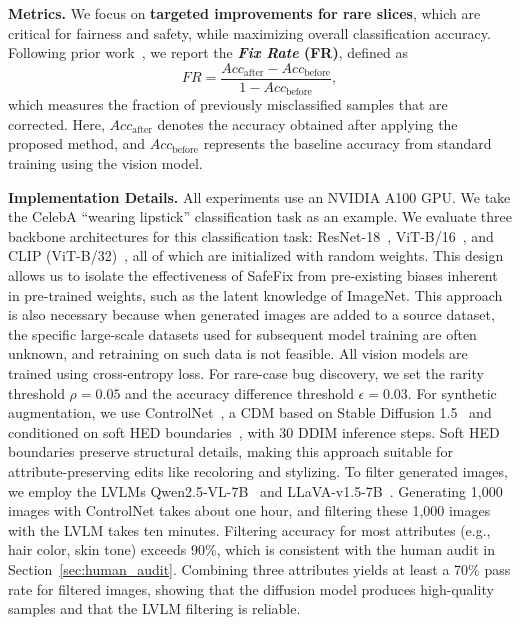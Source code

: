 \documentclass[10pt]{article} %
\newcommand{\controlnet}{ControlNet\xspace}
\newcommand{\qwen}{Qwen2.5-VL\xspace}
\newcommand{\llava}{LLaVA-v1.5\xspace}
\begin{document}
\noindent\textbf{Metrics.} We focus on \textbf{targeted improvements for rare slices}, which are critical for fairness and safety, while maximizing overall classification accuracy. Following prior work~\citep{lai2023improvingpredictionbackwardcompatiblilitynlp}, we report the \textbf{\emph{Fix Rate} (FR)}, defined as
\vspace{-5pt}
\begin{equation}
FR = \frac{Acc_{\text{after}} - Acc_{\text{before}}}{1 - Acc_{\text{before}}},
\end{equation}
which measures the fraction of previously misclassified samples that are corrected. Here, $Acc_{\text{after}}$ denotes the accuracy obtained after applying the proposed method, and $Acc_{\text{before}}$ represents the baseline accuracy from standard training using the vision model.

\noindent \textbf{Implementation Details.} All experiments use an NVIDIA A100 GPU.  
We take the CelebA ``wearing lipstick'' classification task as an example.  
We evaluate three backbone architectures for this classification task: ResNet-18~\citep{he2016deep}, ViT-B/16~\citep{dosovitskiy2020vit}, and CLIP (ViT-B/32)~\citep{radford2021learning}, all of which are initialized with random weights. This design allows us to isolate the effectiveness of SafeFix from pre-existing biases inherent in pre-trained weights, such as the latent knowledge of ImageNet. This approach is also necessary because when generated images are added to a source dataset, the specific large-scale datasets used for subsequent model training are often unknown, and retraining on such data is not feasible. All vision models are trained using cross-entropy loss. For rare-case bug discovery, we set the rarity threshold \(\rho = 0.05\) and the accuracy difference threshold \(\epsilon = 0.03\). For synthetic augmentation, we use \controlnet~\citep{zhang2023adding}, a CDM based on Stable Diffusion 1.5~\citep{rombach2022high} and conditioned on soft HED boundaries~\citep{xie2015holistically}, with 30 DDIM inference steps. Soft HED boundaries preserve structural details, making this approach suitable for attribute-preserving edits like recoloring and stylizing.
To filter generated images, we employ the LVLMs \qwen{}-7B~\citep{bai2025qwen25vl} and \llava{}-7B~\citep{liu2023improvedllava}. Generating 1,000 images with ControlNet takes about one hour, and filtering these 1,000 images with the LVLM takes ten minutes. Filtering accuracy for most attributes (e.g., hair color, skin tone) exceeds 90\%, which is consistent with the human audit in Section~\ref{sec:human_audit}. Combining three attributes yields at least a 70\% pass rate for filtered images, showing that the diffusion model produces high-quality samples and that the LVLM filtering is reliable.
\end{document}
